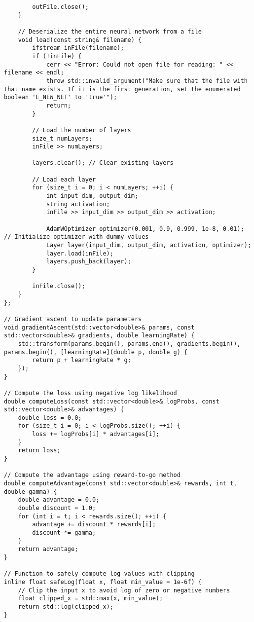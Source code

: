 \begin{verbatim}
        outFile.close();
    }
 
    // Deserialize the entire neural network from a file
    void load(const string& filename) {
        ifstream inFile(filename);
        if (!inFile) {
            cerr << "Error: Could not open file for reading: " << filename << endl;
            throw std::invalid_argument("Make sure that the file with that name exists. If it is the first generation, set the enumerated boolean 'E_NEW_NET' to 'true'");
            return;
        }
 
        // Load the number of layers
        size_t numLayers;
        inFile >> numLayers;
 
        layers.clear(); // Clear existing layers
 
        // Load each layer
        for (size_t i = 0; i < numLayers; ++i) {
            int input_dim, output_dim;
            string activation;
            inFile >> input_dim >> output_dim >> activation;
 
            AdamWOptimizer optimizer(0.001, 0.9, 0.999, 1e-8, 0.01); // Initialize optimizer with dummy values
            Layer layer(input_dim, output_dim, activation, optimizer);
            layer.load(inFile);
            layers.push_back(layer);
        }
 
        inFile.close();
    }
};
 
// Gradient ascent to update parameters
void gradientAscent(std::vector<double>& params, const std::vector<double>& gradients, double learningRate) {
    std::transform(params.begin(), params.end(), gradients.begin(), params.begin(), [learningRate](double p, double g) {
        return p + learningRate * g;
    });
}
 
// Compute the loss using negative log likelihood
double computeLoss(const std::vector<double>& logProbs, const std::vector<double>& advantages) {
    double loss = 0.0;
    for (size_t i = 0; i < logProbs.size(); ++i) {
        loss += logProbs[i] * advantages[i];
    }
    return loss;
}
 
// Compute the advantage using reward-to-go method
double computeAdvantage(const std::vector<double>& rewards, int t, double gamma) {
    double advantage = 0.0;
    double discount = 1.0;
    for (int i = t; i < rewards.size(); ++i) {
        advantage += discount * rewards[i];
        discount *= gamma;
    }
    return advantage;
}
 
// Function to safely compute log values with clipping
inline float safeLog(float x, float min_value = 1e-6f) {
    // Clip the input x to avoid log of zero or negative numbers
    float clipped_x = std::max(x, min_value);
    return std::log(clipped_x);
}
\end{verbatim}

